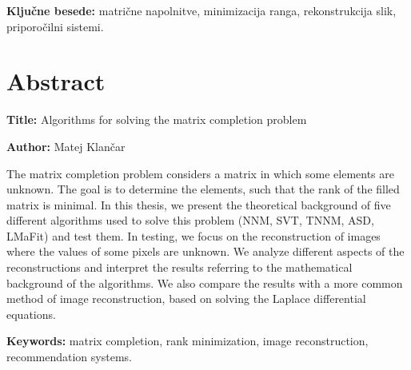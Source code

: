\documentclass[a4paper,12pt,openright]{book}
\newcommand{\ttitleEn}{Algorithms for solving the matrix completion problem}
\newcommand{\tauthor}{Matej Klančar}
\newcommand{\tkeywords}{matrične napolnitve, minimizacija ranga, rekonstrukcija slik, priporočilni sistemi}
\newcommand{\tkeywordsEn}{matrix completion, rank minimization, image reconstruction,
recommendation systems}
\newcommand{\clearemptydoublepage}{\newpage{\pagestyle{empty}\cleardoublepage}}
\begin{document}
\bigskip

\noindent\textbf{Ključne besede:} \tkeywords.
\clearemptydoublepage

{}
\chapter*{Abstract}

\noindent\textbf{Title:} \ttitleEn
\bigskip

\noindent\textbf{Author:} \tauthor
\bigskip

\noindent 
    The matrix completion problem considers a matrix in which some elements are unknown. The goal is to determine the elements, such that the rank of the filled matrix is minimal. In this thesis, we present the theoretical background of five different algorithms used to solve this problem (NNM, SVT, TNNM, ASD, LMaFit) and test them. In testing, we focus on the reconstruction of images where the values of some pixels are unknown.
    We analyze different aspects of the reconstructions and interpret the results 
    referring to the mathematical background of the algorithms. We also compare the results with a more common method of image reconstruction, based on solving the Laplace differential equations.
\bigskip

\noindent\textbf{Keywords:} \tkeywordsEn.
\clearemptydoublepage

\mainmatter
\setcounter{page}{1}
\pagestyle{fancy}











\printbibliography
\end{document}
